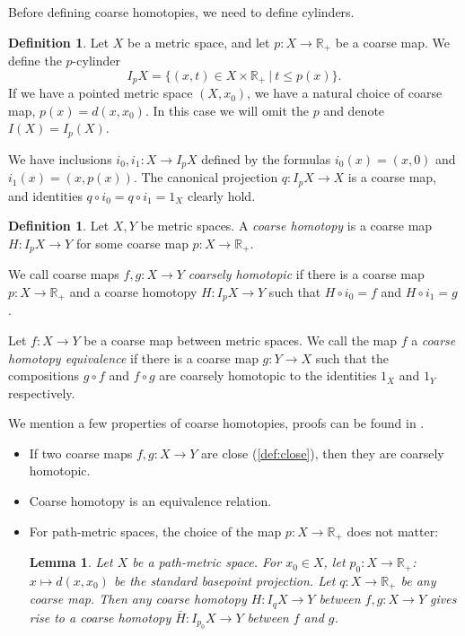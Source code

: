 \documentclass {amsart}
\newcommand {\Rplus}    {\mathbb{R}_{+}}
\newtheorem   {lemma}       [theorem] {Lemma}
\theoremstyle {definition}
\newtheorem   {definition}  [theorem] {Definition}
\begin{document}
Before defining coarse homotopies, we need to define cylinders.

\begin{definition}
    Let \( X \) be a metric space, and let \( p: X \to \Rplus \) be a coarse map.
    We define the \( p \)-cylinder
    \[
        I_p X = \{ (x,t) \in X \times \Rplus \ | \ t \leq p(x) \}
        .
    \]
  If we have a pointed metric space \( (X,x_0) \), we have a natural choice of
  coarse map, \( p(x) = d(x, x_0) \). In this case we will omit the \( p \) and
  denote \( I(X) = I_p(X) \).
\end{definition}

We have inclusions \( i_0, i_1 : X \to I_p X \) defined by the formulas \( i_0
(x) = (x,0) \) and \( i_1 (x) = (x, p(x) ) \). The canonical projection \( q
: I_p X \to X\) is a coarse map, and identities \( q \circ i_0 = q \circ i_1 =
1_X \) clearly hold.

\begin{definition}
    Let \( X, Y \) be metric spaces. A \emph{coarse homotopy} is a coarse map \( H
    : I_p X \to Y\) for some coarse map \( p : X \to \Rplus \).

    We call coarse maps \( f,g : X \to Y \) \emph{coarsely homotopic} if there is a
    coarse map \( p : X \to \Rplus \) and a coarse homotopy \( H : I_p X \to Y \)
    such that \( H \circ i_0 = f \) and \( H \circ i_1 = g \).

    Let \( f : X \to Y \) be a coarse map between metric spaces. We call the map \(
    f \) a \emph{coarse homotopy equivalence} if there is a coarse map \( g : Y \to
    X \) such that the compositions \( g \circ f \) and \( f \circ g \) are
    coarsely homotopic to the identities \( 1_X \) and \( 1_Y \) respectively.
\end{definition}

We mention a few properties of coarse homotopies, proofs can be found in
\cite{mitchenerCoarseHomotopyGroups2020}.

\begin{itemize}
    \item If two coarse maps \( f,g : X \to Y \) are close (\ref{def:close}), then they 
         are coarsely homotopic.
    \item Coarse homotopy is an equivalence relation.
    \item For path-metric spaces, the choice of the map \( p: X \to \Rplus \) does not 
          matter:
        \begin{lemma} \label{lem:chom-invariant}
              \cite[lemma 2.6]{mitchenerCoarseHomotopyGroups2020} Let \( X \) be a
              path-metric space. For \( x_0 \in X \), let
              \( p_0 : X \to \Rplus \): \( x \mapsto d(x,x_0) \) be the standard
              basepoint projection. Let \( q : X \to \Rplus \) be any coarse map. Then
              any coarse homotopy \( H : I_q X \to Y \) between \( f,g : X \to Y \)
              gives rise to a coarse homotopy \( \bar H : I_{p_0} X \to Y \) between \(
              f \) and \( g \).
          \end{lemma}

\end{itemize}
\end{document}
